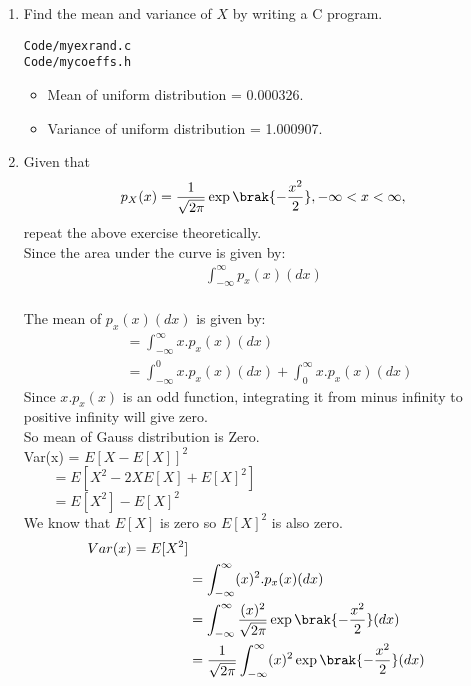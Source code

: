 \documentclass[journal,12pt,twocolumn]{IEEEtran}
\renewcommand\thesection{\arabic{section}}
\begin{document}
\begin{enumerate}[label=\thesection.\arabic*
,ref=\thesection.\theenumi]
\begin{figure}
\centering
\texttt{[image: ./figs/gauss\_pdf]}
\caption{The PDF of $X$}
\label{fig:gauss_pdf}
\end{figure}
%
\item Find the mean and variance of $X$ by writing a C program.
\\
\solution
\begin{lstlisting}
Code/myexrand.c
Code/mycoeffs.h
\end{lstlisting}
\begin{itemize}
\item Mean of uniform distribution = 0.000326.\item Variance of uniform distribution = 1.000907.
\end{itemize}
\item Given that 
\begin{align}
p_{X}(x) = \frac{1}{\sqrt{2\pi}}\exp\brak{-\frac{x^2}{2}}, -\infty < x < \infty,
\end{align}
repeat the above exercise theoretically.
\\
\solution
Since the area under the curve is given by:
\begin{align*}
\int_{-\infty}^{\infty}p_{x}(x)(dx)
\end{align*}
\\
The mean of $p_{x}(x)(dx)$ is given by:
\begin{align*}
&= \int_{-\infty}^{\infty}x.p_{x}(x)(dx)
\\
&= \int_{-\infty}^{0}x.p_{x}(x)(dx) +\int_{0}^{\infty}x.p_{x}(x)(dx)
\end{align*}
Since $x.p_{x}(x)$ is an odd function, integrating it from minus infinity to positive infinity will give zero.
\\
So mean of Gauss distribution is Zero.
\\
Var(x) = $E[X-E[X]]^2$
\\
$~~~~~~~~~=E[X^2-2XE[X]+E[X]^2]$
\\
$~~~~~~~~~=E[X^2]-E[X]^2$
\\
We know that $E[X]$ is zero so $E[X]^2$ is also zero.
\begin{align*}
Var(x) = E[X^2]
\\
& = \int_{-\infty}^{\infty}(x)^2.p_{x}(x)(dx)
\\
& = \int_{-\infty}^{\infty}\frac{(x)^2}{\sqrt{2\pi}}\exp\brak{-\frac{x^2}{2}}(dx)
\\
& = \frac{1}{\sqrt{2\pi}}\int_{-\infty}^{\infty}(x)^2\exp\brak{-\frac{x^2}{2}}(dx)
\end{align*}

\end{enumerate}
\end{document}
